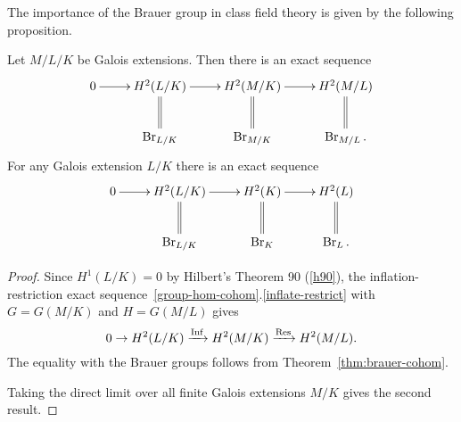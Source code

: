 %
The importance of the Brauer group in class field theory is given by the following proposition.
\begin{thm}
Let $M/L/K$ be Galois extensions. Then there is an exact sequence
\[
\xymatrix{
0\ar[r] & H^2(L/K)\ar[r]\ar@{=}[d] & H^2(M/K)\ar[r]\ar@{=}[d] & H^2(M/L)\ar@{=}[d]\\
& \Br_{L/K} & \Br_{M/K} & \Br_{M/L}.
}
\]
For any Galois extension $L/K$ there is an exact sequence
\[
\xymatrix{
0\ar[r] & H^2(L/K)\ar[r]\ar@{=}[d] & H^2(K)\ar[r]\ar@{=}[d] & H^2(L)\ar@{=}[d]\\
& \Br_{L/K} & \Br_{K} & \Br_{L}.
}
\]
\end{thm}
\begin{proof}
Since $H^1(L/K)=0$ by Hilbert's Theorem 90 (\ref{h90}), 
the inflation-restriction exact sequence~\ref{group-hom-cohom}.\ref{inflate-restrict} with $G=G(M/K)$ and $H=G(M/L)$ gives
\[
0\to H^2(L/K)\xrightarrow{\operatorname{Inf}} H^2(M/K)\xrightarrow{\operatorname{Res}} H^2(M/L). 
\]
The equality with the Brauer groups follows from Theorem~\ref{thm:brauer-cohom}.

Taking the direct limit over all finite Galois extensions $M/K$ gives the second result.
\end{proof}
